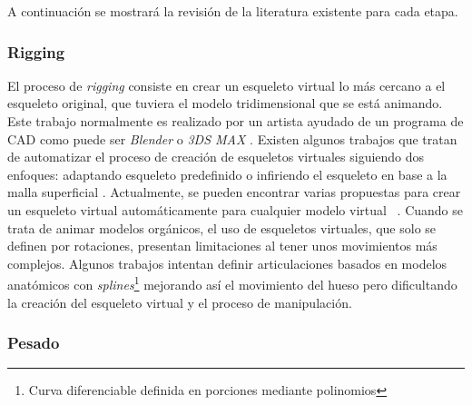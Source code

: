 A continuación se mostrará la revisión de la literatura existente para cada etapa.
\subsubsection{Rigging}
\label{art:rigging}

El proceso de \emph{rigging} consiste en crear un esqueleto virtual lo más cercano a el esqueleto original, que tuviera el modelo tridimensional que se está animando. Este trabajo normalmente es realizado por un artista ayudado de un programa de \ac{CAD} como puede ser \emph{Blender} \cite{blender} o \emph{3DS MAX} \cite{3ds}. 
Existen algunos trabajos que tratan de automatizar el proceso de creación de esqueletos virtuales siguiendo dos enfoques: adaptando esqueleto predefinido \cite{huang2013robust} o infiriendo el esqueleto en base a la malla superficial \cite{jacobson2014part}.
Actualmente, se pueden encontrar varias propuestas para crear un esqueleto virtual automáticamente para cualquier modelo virtual ~\cite{borosan2012rigmesh,feng2014fast,avril2016animation}.
Cuando se trata de animar modelos orgánicos, el uso de esqueletos virtuales, que solo se definen por rotaciones, presentan limitaciones al tener unos movimientos más complejos. Algunos trabajos intentan definir articulaciones basados en modelos anatómicos \cite{joints} con \emph{splines}\footnote{ Curva diferenciable definida en porciones mediante polinomios} mejorando así el movimiento del hueso pero dificultando la creación del esqueleto virtual y el proceso de manipulación.



\subsubsection{Pesado}
\label{art:pesado}

